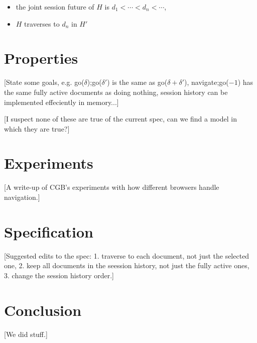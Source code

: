\documentclass{article}
\newcommand{\aNH}{H}
\newcommand{\ltChron}{<}
\newcommand{\aDoc}{d}
\begin{document}
\begin{itemize}
\item the joint session future of $\aNH$ is $\aDoc_1 \ltChron \cdots \ltChron \aDoc_n \ltChron \cdots$,
\item $H$ traverses to $d_n$ in $H'$
\end{itemize}

\section{Properties}

[State some goals, e.g. go($\delta$);go($\delta'$) is the same as go($\delta+\delta'$),
  navigate;go($-1$) has the same fully active documents as doing nothing,
  session history can be implemented effeciently in memory...]

[I suspect none of these are true of the current spec, can we find a model in which
  they are true?]
  
\section{Experiments}

[A write-up of CGB's experiments with how different browsers handle navigation.]

\section{Specification}

[Suggested edits to the spec:
  1. traverse to each document, not just the selected one,
  2. keep all documents in the seession history, not just the fully active ones,
  3. change the session history order.]

\section{Conclusion}

[We did stuff.]
\end{document}
